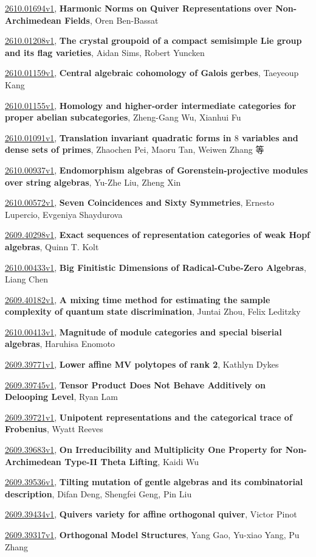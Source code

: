 \documentclass[9pt, a4paper]{article}
\theoremstyle{plain}
\theoremstyle{definition}
\theoremstyle{remark}
\newcommand{\arxiv}[3]{\href{https://arxiv.org/abs/#1}{#1}, \textbf{\textcolor{arxivblue}{#2}}, #3}
\begin{document}
\arxiv{2610.01694v1}{Harmonic Norms on Quiver Representations over Non-Archimedean Fields}{Oren Ben-Bassat}

\arxiv{2610.01208v1}{The crystal groupoid of a compact semisimple Lie group and its flag varieties}{Aidan Sims, Robert Yuncken}

\arxiv{2610.01159v1}{Central algebraic cohomology of Galois gerbes}{Taeyeoup Kang}

\arxiv{2610.01155v1}{Homology and higher-order intermediate categories for proper abelian subcategories}{Zheng-Gang Wu, Xianhui Fu}

\arxiv{2610.01091v1}{Translation invariant quadratic forms in $8$ variables and dense sets of primes}{Zhaochen Pei, Maoru Tan, Weiwen Zhang 等}

\arxiv{2610.00937v1}{Endomorphism algebras of Gorenstein-projective modules over string algebras}{Yu-Zhe Liu, Zheng Xin}

\arxiv{2610.00572v1}{Seven Coincidences and Sixty Symmetries}{Ernesto Lupercio, Evgeniya Shaydurova}

\arxiv{2609.40298v1}{Exact sequences of representation categories of weak Hopf algebras}{Quinn T. Kolt}

\arxiv{2610.00433v1}{Big Finitistic Dimensions of Radical-Cube-Zero Algebras}{Liang Chen}

\arxiv{2609.40182v1}{A mixing time method for estimating the sample complexity of quantum state discrimination}{Juntai Zhou, Felix Leditzky}

\arxiv{2610.00413v1}{Magnitude of module categories and special biserial algebras}{Haruhisa Enomoto}

\arxiv{2609.39771v1}{Lower affine MV polytopes of rank 2}{Kathlyn Dykes}

\arxiv{2609.39745v1}{Tensor Product Does Not Behave Additively on Delooping Level}{Ryan Lam}

\arxiv{2609.39721v1}{Unipotent representations and the categorical trace of Frobenius}{Wyatt Reeves}

\arxiv{2609.39683v1}{On Irreducibility and Multiplicity One Property for Non-Archimedean Type-II Theta Lifting}{Kaidi Wu}

\arxiv{2609.39536v1}{Tilting mutation of gentle algebras and its combinatorial description}{Difan Deng, Shengfei Geng, Pin Liu}

\arxiv{2609.39434v1}{Quivers variety for affine orthogonal quiver}{Victor Pinot}

\arxiv{2609.39317v1}{Orthogonal Model Structures}{Yang Gao, Yu-xiao Yang, Pu Zhang}
\end{document}
